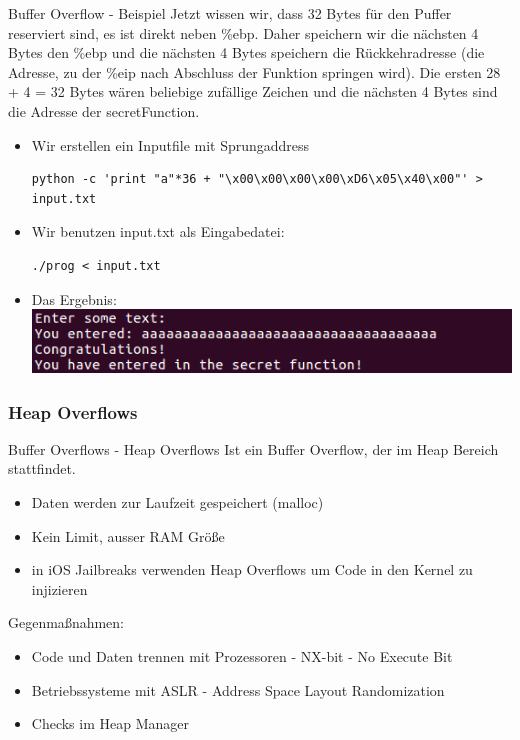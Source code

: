 \documentclass[10pt]{beamer}
\begin{document}
\begin{frame}[fragile]{Buffer Overflow - Beispiel}
  Jetzt wissen wir, dass 32 Bytes f\"ur den Puffer reserviert sind, es ist direkt neben \%ebp. Daher speichern wir die n\"achsten 4 Bytes den \%ebp und die n\"achsten 4 Bytes speichern die R\"uckkehradresse (die Adresse, zu der \%eip nach Abschluss der Funktion springen wird). Die ersten 28 + 4 = 32 Bytes w\"aren beliebige zuf\"allige Zeichen und die n\"achsten 4 Bytes sind die Adresse der secretFunction.

  \begin{itemize}
    \item Wir erstellen ein Inputfile mit Sprungaddress
    \begin{lstlisting}[style=C2Style]
      python -c 'print "a"*36 + "\x00\x00\x00\x00\xD6\x05\x40\x00"' > input.txt
    \end{lstlisting}
    \item Wir benutzen input.txt als Eingabedatei:
    \begin{lstlisting}[style=C2Style]
      ./prog < input.txt
    \end{lstlisting}
    \item Das Ergebnis:
    \includegraphics[width=\textwidth]{buffer-2.png}
  \end{itemize}

\end{frame}

\subsubsection{Heap Overflows}

\begin{frame}[fragile]{Buffer Overflows - Heap Overflows}
  Ist ein Buffer Overflow, der im Heap Bereich stattfindet.
  \begin{itemize}
    \item Daten werden zur Laufzeit gespeichert (malloc)
    \item Kein Limit, ausser RAM Gr\"o{\ss}e
    \item in iOS Jailbreaks verwenden Heap Overflows um Code in den Kernel zu injizieren
  \end{itemize}
  Gegenma{\ss}nahmen:
  \begin{itemize}
    \item Code und Daten trennen mit Prozessoren - NX-bit - No Execute Bit
    \item Betriebssysteme mit ASLR - Address Space Layout Randomization
    \item Checks im Heap Manager
  \end{itemize}
\end{frame}
\end{document}
